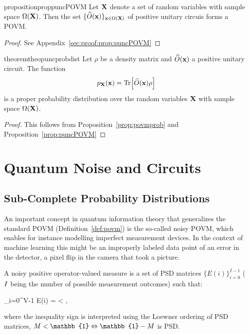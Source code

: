 \begin{restatable}{proposition}{proppuncPOVM}
	\label{prop:puncPOVM}
	Let $\mathbf{X}$ denote a set of random variables with sample space $\Omega(\mathbf{X})$.
	Then the set $\{ \widehat{O}(\mathbf{x})\}_{\mathbf{x} \in \Omega(\mathbf{X})}$ of positive unitary circuis forms a POVM.
\end{restatable}

\begin{proof}
	See Appendix~\ref{sec:proof:prop:puncPOVM}
\end{proof}




\begin{restatable}{theorem}{theopuncprobdist}
	\label{theo:puncprobdist}
	Let $\rho$ be a density matrix and $\widehat{O}(\mathbf{x})$ a positive unitary circuit. The function
	\begin{align}
		p_{\mathbf{X}}(\mathbf{x}) = \Tr [\widehat{O}(\mathbf{x}) \rho]
		\label{eq:theo:prob_operator}
	\end{align}
	is a proper probability distribution over the random variables $\mathbf{X}$ with sample space $\Omega(\mathbf{X})$.
\end{restatable}

\begin{proof}
	This follows from Proposition~\ref{prop:povmprob} and Proposition~\ref{prop:puncPOVM}
\end{proof}





\section{Quantum Noise and Circuits}
\label{sec:noisecircuits}

\subsection{Sub-Complete Probability Distributions}

An important concept in quantum information theory that generalizes the standard POVM (\cf Definition~\ref{def:povm}) is the so-called noisy POVM, which enables for instance modelling imperfect measurement devices. In the context of machine learning this might be an improperly labeled data point of an error in the detector, \eg a pixel flip in the camera that took a picture.
\begin{definition}
	\label{def:noisypovm}
	A noisy positive operator-valued measure
	is a set of PSD  matrices $\{E(i)\}_{i=0}^{I-1}$ ($I$ being the number of possible measurement outcomes) such that:
	\begin{talign}
		\sum_{i=0}^{V-1} E(i) = \subcompletemeasrure < ,
	\end{talign}
	where the inequality sign is interpreted using the Loewner ordering of PSD matrices,
	\ie $\subcompletemeasrure < \mathbb{1} \Leftrightarrow\mathbb{1}-\subcompletemeasrure$ is PSD.
\end{definition}

